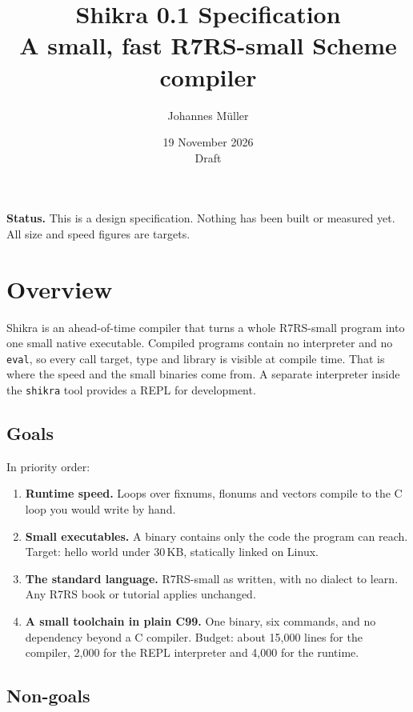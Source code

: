 \documentclass[a4paper,11pt]{article}
\title{Shikra 0.1 Specification\\[4pt]
\large A small, fast R7RS-small Scheme compiler}
\author{Johannes M\"uller}
\date{19 November 2026 \\ Draft}
\begin{document}
\maketitle

\noindent\textbf{Status.} This is a design specification. Nothing has been
built or measured yet. All size and speed figures are targets.

\tableofcontents
\newpage

\section{Overview}

Shikra is an ahead-of-time compiler that turns a whole R7RS-small program
into one small native executable. Compiled programs contain no interpreter
and no \texttt{eval}, so every call target, type and library is visible at
compile time. That is where the speed and the small binaries come from. A
separate interpreter inside the \texttt{shikra} tool provides a REPL for
development.

\subsection{Goals}

In priority order:

\begin{enumerate}
\item \textbf{Runtime speed.} Loops over fixnums, flonums and vectors
  compile to the C loop you would write by hand.
\item \textbf{Small executables.} A binary contains only the code the
  program can reach. Target: hello world under 30\,KB, statically linked on
  Linux.
\item \textbf{The standard language.} R7RS-small as written, with no dialect
  to learn. Any R7RS book or tutorial applies unchanged.
\item \textbf{A small toolchain in plain C99.} One binary, six commands, and
  no dependency beyond a C compiler. Budget: about 15,000 lines for the
  compiler, 2,000 for the REPL interpreter and 4,000 for the runtime.
\end{enumerate}

\subsection{Non-goals}
\end{document}
